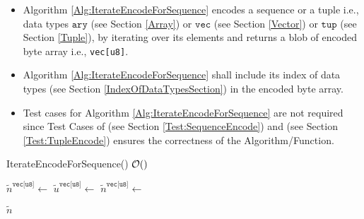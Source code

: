 \documentclass[../alan-handbook.tex]{subfiles}
\begin{document}
 \label{IterateEncodeForSequence}

\begin{itemize}
    \item Algorithm \ref{Alg:IterateEncodeForSequence} encodes a sequence or a tuple i.e., data types $\texttt{ary}$ (see Section \ref{Array}) or $\texttt{vec}$ (see Section \ref{Vector}) or $\texttt{tup}$ (see Section \ref{Tuple}), by iterating over its elements and returns a blob of encoded byte array i.e., \texttt{vec[u8]}. 
    \item Algorithm \ref{Alg:IterateEncodeForSequence} shall include its index of data types (see Section \ref{IndexOfDataTypesSection}) in the encoded byte array.
    \item Test cases for Algorithm \ref{Alg:IterateEncodeForSequence} are not required since Test Cases of  (see Section \ref{Test:SequenceEncode}) and  (see Section \ref{Test:TupleEncode}) ensures the correctness of the  Algorithm/Function. 
\end{itemize}

\begin{algorithm}
\caption{IterateEncodeForSequence() \hfill $\mathcal{O}()$ }
\label{Alg:IterateEncodeForSequence}
\begin{algorithmic}
     \Comment{\ref{SetNotations}}
            \State $\tilde{n}^{\texttt{vec[u8]}} \gets$  \Comment{\ref{Encode}}
        \Else 
            \State $\tilde{u}^{\texttt{vec[u8]}} \gets$  \Comment{\ref{Encode}}
            \State $\tilde{n}^{\texttt{vec[u8]}} \gets$  \Comment{\ref{ConcatByteArrays}} 
        \EndIf
    \EndFor

    \Return $\tilde{n}$
\EndFunction
\end{algorithmic}
\end{algorithm}

 \label{IterateValueEncodeForSequence}
\end{document}
